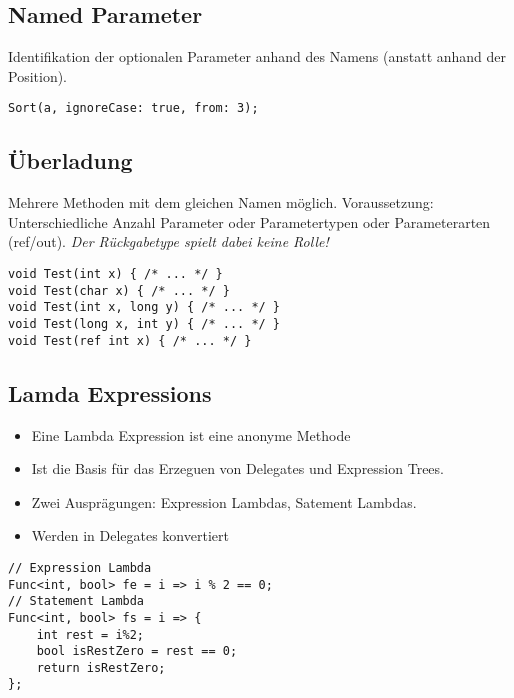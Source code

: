 \subsection{Named Parameter}
Identifikation der optionalen Parameter anhand des Namens (anstatt anhand der Position). 
\begin{lstlisting}
Sort(a, ignoreCase: true, from: 3);
\end{lstlisting}

\subsection{Überladung}
Mehrere Methoden mit dem gleichen Namen möglich. Voraussetzung: Unterschiedliche Anzahl Parameter oder Parametertypen oder Parameterarten (ref/out). \textit{Der Rückgabetype spielt dabei keine Rolle!}
\begin{lstlisting}
void Test(int x) { /* ... */ } 
void Test(char x) { /* ... */ } 
void Test(int x, long y) { /* ... */ } 
void Test(long x, int y) { /* ... */ } 
void Test(ref int x) { /* ... */ }
\end{lstlisting}



\subsection{Lamda Expressions}
\begin{itemize}
  \itemsep -0.5em 
  \item Eine Lambda Expression ist eine anonyme Methode
  \item Ist die Basis für das Erzeguen von Delegates und Expression Trees.
  \item Zwei Ausprägungen: Expression Lambdas, Satement Lambdas.	
  \item Werden in Delegates konvertiert
\end{itemize}

\begin{lstlisting}
// Expression Lambda 
Func<int, bool> fe = i => i % 2 == 0;
// Statement Lambda 
Func<int, bool> fs = i => {
	int rest = i%2; 
	bool isRestZero = rest == 0; 
	return isRestZero;
};
\end{lstlisting}

\pagebreak
